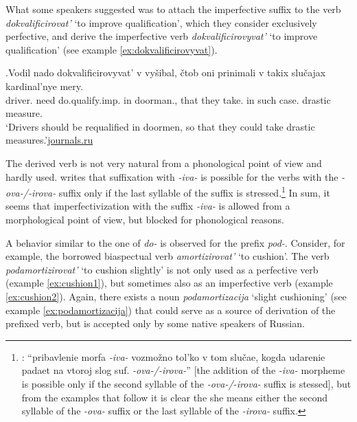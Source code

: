 What some speakers suggested was to attach the imperfective suffix to the verb \textit{dokvalificirovat'} `to improve qualification', which they consider exclusively perfective, and derive the imperfective verb \textit{dokvalificirovyvat'} `to improve qualification' (see example \ref{ex:dokvalificirovyvat}). 

\exg.\label{ex:dokvalificirovyvat}Vodil nado dokvalificirovyvat' v vy\v{s}ibal, \v{c}tob oni prinimali v takix slu\v{c}ajax kardinal'nye mery.\\
driver. need do.qualify.imp. in doorman., that they take. in such case. drastic measure.\\
\trans `Drivers should be requalified in doormen, so that they could take drastic measures.'\hbox{}\hfill\hbox{\url{journals.ru}}

The derived verb is not very natural from a phonological point of view and hardly used. \citet[590]{Shvedova:82} writes that suffixation with \textit{-iva-} is possible for the verbs with the \textit{-ova-/-irova-} suffix only if the last syllable of the suffix is stressed.\footnote{\citet[590]{Shvedova:82}: ``pribavlenie morfa \textit{-­iva-} vozmo\v{z}no tol'ko v tom slu\v{c}ae, kogda udarenie padaet na vtoroj slog suf. \textit{-­ova-/-irova-}'' [the addition of the \textit{-iva-} morpheme is possible only if the second syllable of the \textit{-­ova-/-irova-} suffix is stessed], but from the examples that follow it is clear the she means either the second syllable of the \textit{-ova-} suffix or the last syllable of the \textit{-irova-} suffix.} In sum, it seems that imperfectivization with the suffix \textit{-iva-} is allowed from a morphological point of view, but blocked for phonological reasons.
 
A behavior similar to the one of \textit{do-} is observed for the prefix \textit{pod-}. Consider, for example, the borrowed biaspectual verb \textit{amortizirovat'} `to cushion'. The verb \textit{podamortizirovat'} `to cushion slightly' is not only used as a perfective verb (example \ref{ex:cushion1}), but sometimes also as an imperfective verb (example \ref{ex:cushion2}). Again, there exists a noun \textit{podamortizacija} `slight cushioning' (see example \ref{ex:podamortizacija}) that could serve as a source of derivation of the prefixed verb, but is accepted only by some native speakers of Russian.


